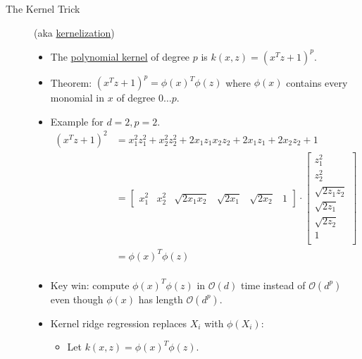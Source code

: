 \documentclass[10pt]{article}
\begin{document}
\begin{description}
	\item[The Kernel Trick] (aka \underline{kernelization})
	\
	\begin{itemize}
		\item The \underline{polynomial kernel} of degree $p$ is $k(x,z) = (x^{T}z + 1)^{p}$.
		\item Theorem: $(x^{T}z + 1)^{p} = \phi(x)^{T}\phi(z)$ where $\phi(x)$ contains every monomial in $x$ of degree $0 \dots p$.
		\item Example for $d=2, p=2$.
			\begin{align*}
				(x^{T}z+1)^{2} &= x_{1}^{2}z_{1}^{2} + x_{2}^{2}z_{2}^{2} + 2x_{1}z_{1}x_{2}z_{2} + 2x_{1}z_{1} + 2x_{2}z_{2} + 1\\
					& = \begin{bmatrix}
						x_{1}^{2} & x_{2}^{2} & \sqrt{2x_{1}x_{2}} & \sqrt{2x_{1}} & \sqrt{2x_{2}} & 1
					\end{bmatrix}
					\cdot
					\begin{bmatrix}
						z_{1}^{2}\\
						z_{2}^{2}\\
						\sqrt{2z_{1}z_{2}}\\
						\sqrt{2z_{1}}\\
						\sqrt{2z_{2}}\\
						1\\
					\end{bmatrix}\\
					&= \phi(x)^{T} \phi(z)\\
			\end{align*}
		\item Key win: compute $\phi(x)^{T} \phi(z)$ in $\mathcal{O}(d)$ time instead of $\mathcal{O}(d^{p})$ even though $\phi(x)$ has length $\mathcal{O}(d^{p})$.
		\item Kernel ridge regression replaces $X_{i}$ with $\phi(X_{i})$:
			\begin{itemize}
				\item Let $k(x, z) = \phi(x)^{T}\phi(z)$.	
			\end{itemize} 
	\end{itemize}
\end{description}

\newpage
\end{document}
